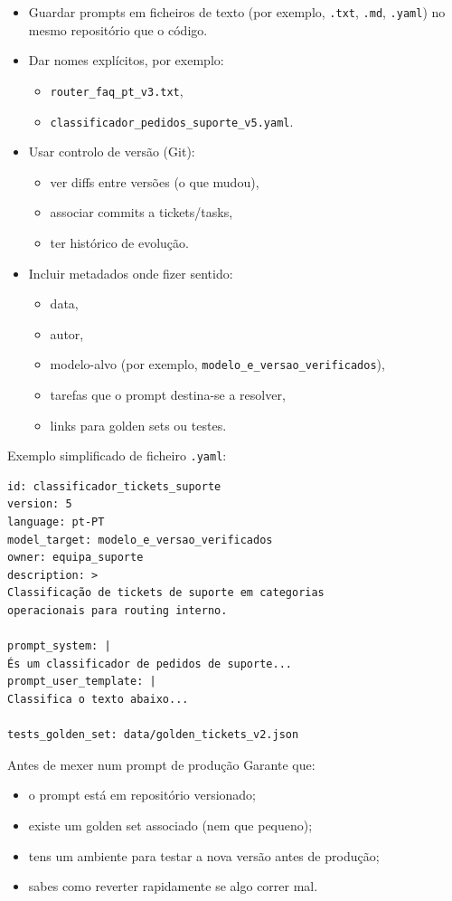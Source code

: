 \begin{itemize}[leftmargin=*]
\item Guardar prompts em ficheiros de texto (por exemplo, \texttt{.txt}, \texttt{.md}, \texttt{.yaml}) no mesmo repositório que o código.
\item Dar nomes explícitos, por exemplo:
\begin{itemize}[leftmargin=*]
\item \texttt{router\_faq\_pt\_v3.txt},
\item \texttt{classificador\_pedidos\_suporte\_v5.yaml}.
\end{itemize}
\item Usar controlo de versão (Git):
\begin{itemize}[leftmargin=*]
\item ver diffs entre versões (o que mudou),
\item associar commits a tickets/tasks,
\item ter histórico de evolução.
\end{itemize}
\item Incluir metadados onde fizer sentido:
\begin{itemize}[leftmargin=*]
\item data,
\item autor,
\item modelo-alvo (por exemplo, \texttt{modelo\_e\_versao\_verificados}),
\item tarefas que o prompt destina-se a resolver,
\item links para golden sets ou testes.
\end{itemize}
\end{itemize}

Exemplo simplificado de ficheiro \texttt{.yaml}:

\begin{lstlisting}
id: classificador_tickets_suporte
version: 5
language: pt-PT
model_target: modelo_e_versao_verificados
owner: equipa_suporte
description: >
Classificação de tickets de suporte em categorias
operacionais para routing interno.

prompt_system: |
És um classificador de pedidos de suporte...
prompt_user_template: |
Classifica o texto abaixo...

tests_golden_set: data/golden_tickets_v2.json
\end{lstlisting}

\begin{checklistbox}{Antes de mexer num prompt de produção}
Garante que:

\begin{itemize}[leftmargin=*]
\item o prompt está em repositório versionado;
\item existe um golden set associado (nem que pequeno);
\item tens um ambiente para testar a nova versão antes de produção;
\item sabes como reverter rapidamente se algo correr mal.
\end{itemize}
\end{checklistbox}

